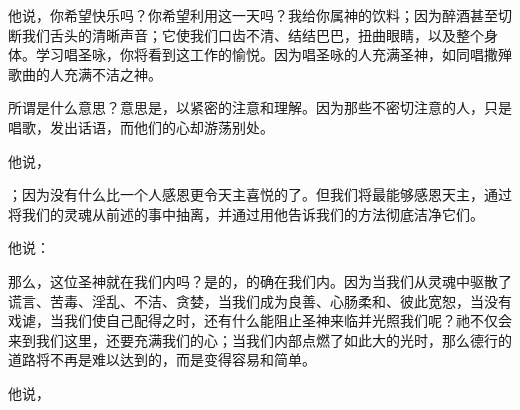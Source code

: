 他说，你希望快乐吗？你希望利用这一天吗？我给你属神的饮料；因为醉酒甚至切断我们舌头的清晰声音；它使我们口齿不清、结结巴巴，扭曲眼睛，以及整个身体。学习唱圣咏，你将看到这工作的愉悦。因为唱圣咏的人充满圣神，如同唱撒殚歌曲的人充满不洁之神。\par

所谓是什么意思？意思是，以紧密的注意和理解。因为那些不密切注意的人，只是唱歌，发出话语，而他们的心却游荡别处。\par

他说，\par

；因为没有什么比一个人感恩更令天主喜悦的了。但我们将最能够感恩天主，通过将我们的灵魂从前述的事中抽离，并通过用他告诉我们的方法彻底洁净它们。\par

他说：\par

那么，这位圣神就在我们内吗？是的，的确在我们内。因为当我们从灵魂中驱散了谎言、苦毒、淫乱、不洁、贪婪，当我们成为良善、心肠柔和、彼此宽恕，当没有戏谑，当我们使自己配得之时，还有什么能阻止圣神来临并光照我们呢？祂不仅会来到我们这里，还要充满我们的心；当我们内部点燃了如此大的光时，那么德行的道路将不再是难以达到的，而是变得容易和简单。\par

他说，\par

